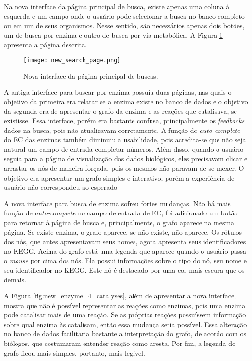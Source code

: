 \indent Na nova interface da página principal de busca, existe apenas uma coluna à esquerda e um campo onde o usuário pode selecionar a busca no banco completo ou em um de seus organismos. Nesse sentido, são necessários apenas dois botões, um de busca por enzima e outro de busca por via metabólica. A Figura \ref{fig:new_search_page} apresenta a página descrita.

\begin{figure}[!h]
    \centering
    \texttt{[image: new\_search\_page.png]}
    \caption{Nova interface da página principal de buscas.}
    \label{fig:new_search_page}
\end{figure}

\indent A antiga interface para buscar por enzima possuía duas páginas, nas quais o objetivo da primeira era relatar se a enzima existe no banco de dados e o objetivo da segunda era de apresentar o grafo da enzima e as reações que catalisava, se existisse. Essa interface, porém era bastante confusa, principalmente os \textit{feedbacks} dados na busca, pois não atualizavam corretamente. A função de \textit{auto-complete} do EC das enzimas também diminuiu a usabilidade, pois acredita-se que não seja natural um campo de entrada completar números. Além disso, quando o usuário seguia para a página de visualização dos dados biológicos, eles precisavam clicar e arrastar os nós de maneira forçada, pois os mesmos não paravam de se mexer. O objetivo era apresentar um grafo simples e interativo, porém a experiência de usuário não correspondeu ao esperado.

\indent A nova interface para busca de enzima sofreu fortes mudanças. Não há mais função de \textit{auto-complete} no campo de entrada de EC, foi adicionado um botão para retornar à página de busca e, principalmente, o grafo aparece na mesma página. Se existe enzima, o grafo aparece, se não existe, não aparece. Os rótulos dos nós, que antes apresentavam seus nomes, agora apresenta seus identificadores no KEGG. Acima do grafo está uma legenda que aparece quando o usuário passa o \textit{mouse} por cima dos nós. Ela possui informações sobre o tipo do nó, seu nome e seu identificador no KEGG. Este nó é destacado por uma cor mais escura que os demais.

\indent A Figura \ref{fig:new_enzyme_4_catalyses}, além de apresentar a nova interface, mostra que não é possível representar as reações como enzimas, pois uma enzima pode catalisar mais de uma reação. Se as próprias reações possuíssem informação sobre qual enzima às catalisam, então essa mudança seria possível. Essa alteração no banco de dados facilitaria bastante a interpretação do grafo, de acordo com os biólogos, que costumaram entender reação como aresta. Por fim, a legenda do grafo ficou mais simples, portanto, mais legível.

